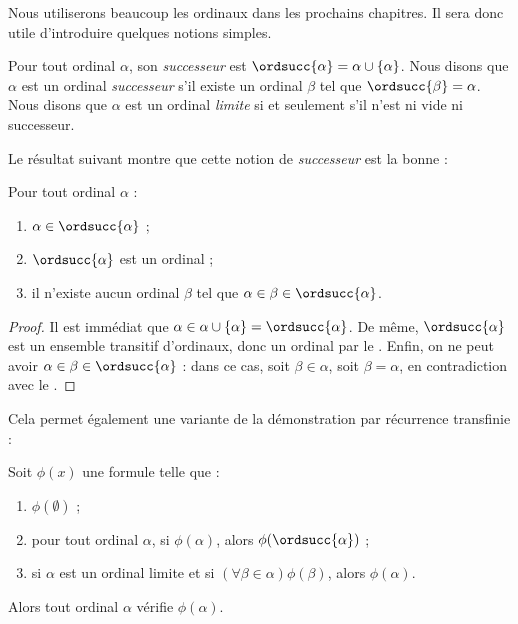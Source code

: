 \documentclass[../../../include/open-logic-section]{subfiles}
\begin{document}

Nous utiliserons beaucoup les ordinaux dans les prochains chapitres.
Il sera donc utile d'introduire quelques notions simples.

\begin{defn}
Pour tout ordinal $\alpha$, son \emph{successeur} est
$\ordsucc{\alpha} =\alpha \cup \{\alpha\}$. Nous disons que
$\alpha$ est un ordinal \emph{successeur} s'il existe un ordinal
$\beta$ tel que $\ordsucc{\beta} = \alpha$. Nous disons que
$\alpha$ est un ordinal \emph{limite} si et seulement s'il n'est ni
vide ni successeur.
\end{defn}
\noindent
Le résultat suivant montre que cette notion de \emph{successeur} est
la bonne :

\begin{prop}
Pour tout ordinal $\alpha$ :
\begin{enumerate}
	\item $\alpha \in \ordsucc{\alpha}$ ;
	\item $\ordsucc{\alpha}$ est un ordinal ;
	\item il n'existe aucun ordinal $\beta$ tel que
	$\alpha \in \beta \in \ordsucc{\alpha}$.
\end{enumerate}
\end{prop}

\begin{proof}
Il est immédiat que
$\alpha \in \alpha \cup \{\alpha\} = \ordsucc{\alpha}$.
De même, $\ordsucc{\alpha}$ est un ensemble transitif d'ordinaux,
donc un ordinal par le .
Enfin, on ne peut avoir
$\alpha \in \beta \in \ordsucc{\alpha}$ : dans ce cas, soit
$\beta \in \alpha$, soit $\beta = \alpha$, en contradiction avec
le .
\end{proof}
\noindent
Cela permet également une variante de la démonstration par récurrence
transfinie :

\begin{thm}
Soit $\phi(x)$ une formule telle que :
\begin{enumerate}
	\item $\phi(\emptyset)$ ;
	\item pour tout ordinal $\alpha$, si $\phi(\alpha)$, alors
	$\phi(\ordsucc{\alpha})$ ;
	\item si $\alpha$ est un ordinal limite et si
	$(\forall \beta \in \alpha)\phi(\beta)$, alors $\phi(\alpha)$.
\end{enumerate}
Alors tout ordinal $\alpha$ vérifie $\phi(\alpha)$.
\end{thm}
\end{document}
